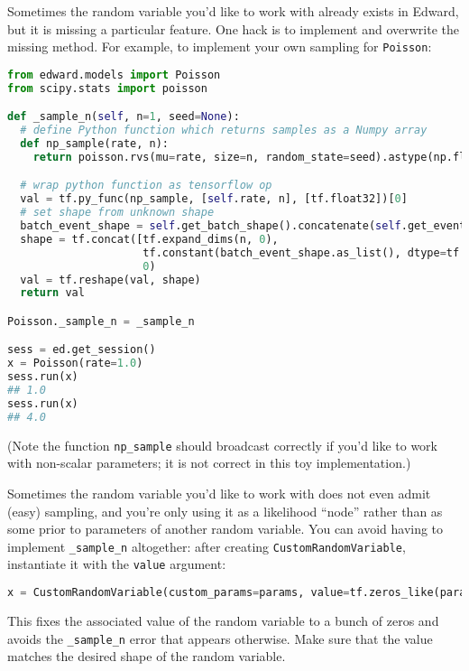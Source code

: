 Sometimes the random variable you'd like to work with already exists
in Edward, but it is missing a particular feature. One hack is to
implement and overwrite the missing method. For example, to implement
your own sampling for \texttt{Poisson}:

\begin{lstlisting}[language=Python]
from edward.models import Poisson
from scipy.stats import poisson

def _sample_n(self, n=1, seed=None):
  # define Python function which returns samples as a Numpy array
  def np_sample(rate, n):
    return poisson.rvs(mu=rate, size=n, random_state=seed).astype(np.float32)

  # wrap python function as tensorflow op
  val = tf.py_func(np_sample, [self.rate, n], [tf.float32])[0]
  # set shape from unknown shape
  batch_event_shape = self.get_batch_shape().concatenate(self.get_event_shape())
  shape = tf.concat([tf.expand_dims(n, 0),
                     tf.constant(batch_event_shape.as_list(), dtype=tf.int32)],
                     0)
  val = tf.reshape(val, shape)
  return val

Poisson._sample_n = _sample_n

sess = ed.get_session()
x = Poisson(rate=1.0)
sess.run(x)
## 1.0
sess.run(x)
## 4.0
\end{lstlisting}

(Note the function \texttt{np_sample} should broadcast correctly if
you'd like to work with non-scalar parameters; it is not correct in
this toy implementation.)

Sometimes the random variable you'd like to work with does not even
admit (easy) sampling, and you're only using it as a likelihood ``node'' rather
than as some prior to parameters of another random variable.
You can avoid having to implement \texttt{_sample_n} altogether:
after creating \texttt{CustomRandomVariable}, instantiate it with the
\texttt{value} argument:

\begin{lstlisting}[language=Python]
x = CustomRandomVariable(custom_params=params, value=tf.zeros_like(params))
\end{lstlisting}

This fixes the associated value of the random variable to a bunch of
zeros and avoids the \texttt{_sample_n} error that appears otherwise.
Make sure that the value matches the desired shape of the random
variable.
